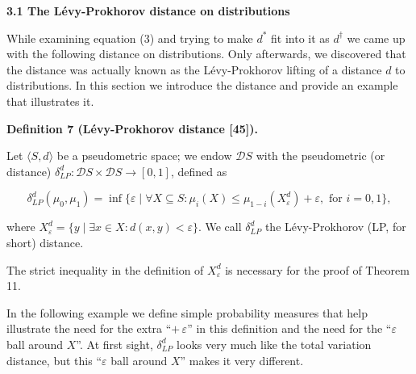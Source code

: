 \documentclass[10pt,a4paper]{article}
\begin{document}
 
 
 
\par\medskip\noindent\textbf{3.1 The Lévy-Prokhorov distance on distributions}\par
 
 
While examining equation (3) and trying to make $d^{*}$ fit into it as $d^{\dagger}$ we came up with the following distance on distributions. Only afterwards, we discovered that the distance was actually known as the Lévy-Prokhorov lifting of a distance $d$ to distributions. In this section we introduce the distance and provide an example that illustrates it.\par
 
 
 
\par\medskip\noindent\textbf{Definition 7 (Lévy-Prokhorov distance [45]).}\par
 
 
Let $\langle S,d\rangle$ be a pseudometric space; we endow $\mathcal{D}S$ with the pseudometric (or distance) $\delta^{d}_{LP}:\mathcal{D}S\times\mathcal{D}S\to[0,1]$, defined as\par
  
\par  \quad  \[\delta^{d}_{LP}(\mu_{0},\mu_{1})=\inf\{\varepsilon\mid\forall X\subseteq S:\mu_{i}(X)\leq\mu_{1-i}(X^{d}_{\varepsilon})+\varepsilon,\mbox{ for }i=0,1\},\]\quad  \quad  
  
where $X^{d}_{\varepsilon}=\{y\mid\exists x\in X:d(x,y)<\varepsilon\}$. We call $\delta^{d}_{LP}$ the Lévy-Prokhorov (LP, for short) distance.\par
 
 
 
 
The strict inequality in the definition of $X_{\varepsilon}^{d}$ is necessary for the proof of Theorem 11.\par
 
 
 
In the following example we define simple probability measures that help illustrate the need for the extra “$+\,\varepsilon$” in this definition and the need for the “$\varepsilon$ ball around $X$”. At first sight, $\delta^{d}_{LP}$ looks very much like the total variation distance, but this “$\varepsilon$ ball around $X$” makes it very different.\par
 
\end{document}
